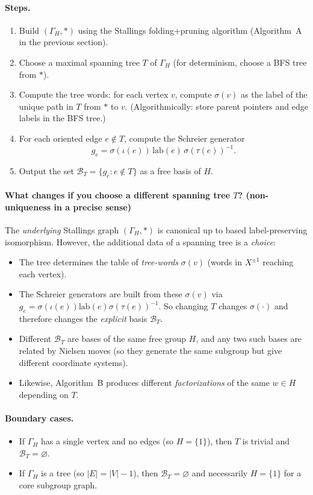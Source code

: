 \documentclass[11pt]{article}
\theoremstyle{definition}
\theoremstyle{plain}
\theoremstyle{remark}
\newcommand{\lab}{\mathrm{lab}}
\begin{document}
\paragraph{Steps.}
\begin{enumerate}[leftmargin=2.2em]
\item Build $(\Gamma_H,*)$ using the Stallings folding+pruning algorithm (Algorithm~A in the previous section).
\item Choose a maximal spanning tree $T$ of $\Gamma_H$ (for determinism, choose a BFS tree from $*$).
\item Compute the tree words:
for each vertex $v$, compute $\sigma(v)$ as the label of the unique path in $T$ from $*$ to $v$.
(Algorithmically: store parent pointers and edge labels in the BFS tree.)
\item For each oriented edge $e\notin T$, compute the Schreier generator
\[
g_e=\sigma(\iota(e))\,\lab(e)\,\sigma(\tau(e))^{-1}.
\]
\item Output the set $\mathcal B_T=\{g_e:e\notin T\}$ as a free basis of $H$.
\end{enumerate}


\paragraph{What changes if you choose a different spanning tree $T$? (non-uniqueness in a precise sense)}
The \emph{underlying} Stallings graph $(\Gamma_H,*)$ is canonical up to based label-preserving isomorphism.
However, the additional data of a spanning tree is a \emph{choice}:
\begin{itemize}[leftmargin=2em]
\item The tree determines the table of \emph{tree-words} $\sigma(v)$ (words in $X^{\pm1}$ reaching each vertex).
\item The Schreier generators are built from these $\sigma(v)$ via $g_e=\sigma(\iota(e))\lab(e)\sigma(\tau(e))^{-1}$.
So changing $T$ changes $\sigma(\cdot)$ and therefore changes the \emph{explicit} basis $\mathcal B_T$.
\item Different $\mathcal B_T$ are bases of the same free group $H$, and any two such bases are related by Nielsen moves
(so they generate the same subgroup but give different coordinate systems).
\item Likewise, Algorithm~B produces different \emph{factorizations} of the same $w\in H$ depending on $T$.
\end{itemize}

\paragraph{Boundary cases.}
\begin{itemize}[leftmargin=2em]
\item If $\Gamma_H$ has a single vertex and no edges (so $H=\{1\}$), then $T$ is trivial and $\mathcal B_T=\varnothing$.
\item If $\Gamma_H$ is a tree (so $|E|=|V|-1$), then $\mathcal B_T=\varnothing$ and necessarily $H=\{1\}$ for a core subgroup graph.
\end{itemize}
\end{document}
